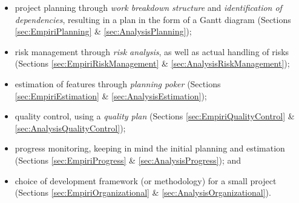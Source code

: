\begin{itemize}
    \item project planning through \emph{work breakdown structure} and \emph{identification of
        dependencies}, resulting in a plan in the form of a Gantt diagram (Sections
        \ref{sec:EmpiriPlanning} \& \ref{sec:AnalysisPlanning});
    \item risk management through \emph{risk analysis}, as well as actual handling of risks
        (Sections \ref{sec:EmpiriRiskManagement} \& \ref{sec:AnalysisRiskManagement});
    \item estimation of features through \emph{planning poker} (Sections
        \ref{sec:EmpiriEstimation} \& \ref{sec:AnalysisEstimation});
    \item quality control, using a \emph{quality plan} (Sections \ref{sec:EmpiriQualityControl}
        \& \ref{sec:AnalysisQualityControl});
    \item progress monitoring, keeping in mind the initial planning and estimation (Sections
        \ref{sec:EmpiriProgress} \& \ref{sec:AnalysisProgress}); and
    \item choice of development framework (or methodology) for a small project (Sections
        \ref{sec:EmpiriOrganizational} \& \ref{sec:AnalysisOrganizational}).
\end{itemize}